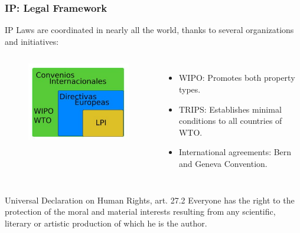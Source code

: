 \documentclass{beamer}
\begin{document}
\begin{frame}
\frametitle{IP: Legal Framework}

IP Laws are coordinated in nearly all the world, thanks to several
organizations and initiatives:

\begin{columns}

\column[t]{2.5cm}

\begin{figure}
\vspace{-0.6cm}
\begin{flushleft}
	\includegraphics[scale=0.3,clip=true]{figs/legal_framework.png}
\end{flushleft}
\end{figure}


\column[t]{8cm}

\begin{itemize}
\item WIPO: Promotes both property types.
\item TRIPS: Establishes minimal conditions to all countries of WTO.
\item International agreements: Bern and Geneva Convention. 
\end{itemize}

\end{columns}

\small
\begin{block}{Universal Declaration on Human Rights, art. 27.2}
Everyone has the right to the protection of the moral and material interests resulting from any scientific, literary or artistic production of which he is the author.
\end{block}


\end{frame}

\end{document}
